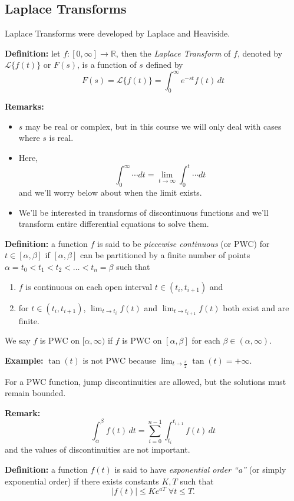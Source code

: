 \documentclass[11pt]{article}
\newcommand{\example}{\textbf{Example: }}
\newcommand{\definition}{\textbf{Definition: }}
\newcommand{\lap}{\mathcal{L}}
\newcommand{\intzi}{\int_0^{\infty}}
\begin{document}
\subsection{Laplace Transforms}
	Laplace Transforms were developed by Laplace and Heaviside.

	\definition let $f: [0, \infty] \rightarrow \mathbb{R}$, then the \emph{Laplace Transform} of $f$, denoted by $\lap\{f(t)\}$ or $F(s)$, is a function of $s$ defined by
		$$ F(s) = \lap\{f(t)\} = \int_0^{\infty} e^{-st} f(t) \,dt $$

	\textbf{Remarks:}
		\begin{itemize}
			\item $s$ may be real or complex, but in this course we will only deal with cases where $s$ is real.
			\item Here,
				$$ \intzi \cdots dt = \lim_{t \to \infty} \int_0^t \cdots dt $$
			and we'll worry below about when the limit exists.
			\item We'll be interested in transforms of discontinuous functions and we'll transform entire differential equations to solve them.
		\end{itemize}

	\definition a function $f$ is said to be \emph{piecewise continuous} (or PWC) for $t \in [\alpha, \beta]$ if $[\alpha, \beta]$ can be partitioned by a finite number of points $\alpha = t_0 < t_1 < t_2 < \ldots < t_n = \beta$ such that
		\begin{enumerate}
			\item $f$ is continuous on each open interval $t \in (t_i, t_{i+1})$ and
			\item for $t \in (t_i, t_{i+1})$, $\lim_{t \to t_i} f(t)$ and $\lim_{t \to t_{i+1}} f(t)$ both exist and are finite.
		\end{enumerate}
	We say $f$ is PWC on $[\alpha, \infty)$ if $f$ is PWC on $[\alpha, \beta]$ for each $\beta \in (\alpha, \infty)$.

	\example $\tan(t)$ is not PWC because $\lim_{t \to \frac{\pi}{2}} \tan(t) = + \infty$.

	For a PWC function, jump discontinuities are allowed, but the solutions must remain bounded.

	\textbf{Remark:}
		$$ \int_{\alpha}^{\beta} f(t) \,dt = \sum_{i = 0}^{n-1} \int_{t_i}^{t_{i+1}} f(t)\,dt $$
	and the values of discontinuities are not important.

	\definition a function $f(t)$ is said to have \emph{exponential order ``a''} (or simply exponential order) if there exists constants $K,T$ such that
		$$ |f(t)| \leq K e^{aT} \; \forall t \leq T. $$
\end{document}
